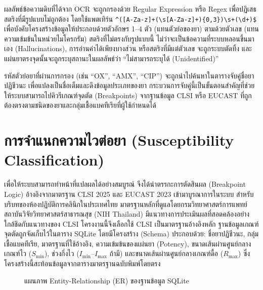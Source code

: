 ผลลัพธ์ข้อความดิบที่ได้จาก OCR จะถูกกรองด้วย Regular Expression หรือ Regex เพื่อปฏิเสธสตริงที่มีรูปแบบไม่ถูกต้อง โดยใช้แพตเทิร์น \texttt{\^{}([A-Za-z]+(\textbackslash{}s[A-Za-z]+)\{0,3\})\textbackslash{}s+(\textbackslash{}d+)\$} เพื่อบังคับโครงสร้างข้อมูลให้ประกอบด้วยตัวอักษร 1--4 ตัว (แทนตัวย่อของยา) ตามด้วยตัวเลข (แทนความเข้มข้นในหน่วยไมโครกรัม) สตริงที่ไม่ตรงกับรูปแบบนี้ ไม่ว่าจะเป็นข้อความที่ระบบหลอนขึ้นมาเอง (Hallucinations), การอ่านค่าได้เพียงบางส่วน หรือสตริงที่มีแต่ตัวเลข จะถูกระบบตัดทิ้ง และแผ่นยาตรงจุดนั้นจะถูกระบุสถานะในผลลัพธ์ว่า ``ไม่สามารถระบุได้ (Unidentified)''

รหัสตัวย่อยาที่ผ่านการกรอง (เช่น ``OX'', ``AMX'', ``CIP'') จะถูกนำไปค้นหาในตารางจับคู่ชื่อยาปฏิชีวนะ เพื่อแปลงเป็นชื่อเต็มและดึงข้อมูลประเภทของยา กระบวนการจับคู่นี้เป็นขั้นตอนสำคัญที่ช่วยให้ระบบสามารถไปคิวรีเกณฑ์จุดตัด (Breakpoints) จากฐานข้อมูล CLSI หรือ EUCAST ที่ถูกต้องตรงตามชนิดของยาและกลุ่มเชื้อแบคทีเรียที่ผู้ใช้กำหนดได้

\section{การจำแนกความไวต่อยา (Susceptibility Classification)}

เพื่อให้ระบบสามารถทำหน้าที่แปลผลได้อย่างสมบูรณ์ จึงได้นำตรรกะการตัดสินผล (Breakpoint Logic) อ้างอิงจากมาตรฐาน CLSI 2025 \cite{clsi2025} และ EUCAST 2023 \cite{eucast2023} เข้ามาบูรณาการในระบบ สำหรับบริบทของห้องปฏิบัติการคลินิกในประเทศไทย มาตรฐานหลักที่ดูแลโดยกรมวิทยาศาสตร์การแพทย์ สถาบันวิจัยวิทยาศาสตร์สาธารณสุข (NIH Thailand) \cite{dmsc_nih} มีแนวทางการประเมินผลที่สอดคล้องอย่างใกล้ชิดกับแนวทางของ CLSI โครงงานนี้จึงเลือกใช้ CLSI เป็นมาตรฐานอ้างอิงหลัก ฐานข้อมูลเกณฑ์จุดตัดถูกจัดเก็บไว้ในตาราง SQLite โดยมีโครงสร้าง (Schema) ประกอบด้วย: ชื่อยาปฏิชีวนะ, กลุ่มเชื้อแบคทีเรีย, มาตรฐานที่ใช้อ้างอิง, ความเข้มข้นของแผ่นยา (Potency), ขนาดเส้นผ่านศูนย์กลางเกณฑ์ไว ($S_{\min}$), ช่วงกึ่งไว ($I_{\min}$--$I_{\max}$ ถ้ามี) และขนาดเส้นผ่านศูนย์กลางเกณฑ์ดื้อ ($R_{\max}$) ซึ่งโครงสร้างนี้สะท้อนข้อมูลจากตารางมาตรฐานฉบับพิมพ์โดยตรง

\begin{figure}[H]
  \centering
  \caption{แผนภาพ Entity-Relationship (ER) ของฐานข้อมูล SQLite}
  \label{fig:db_schema}
\end{figure}

